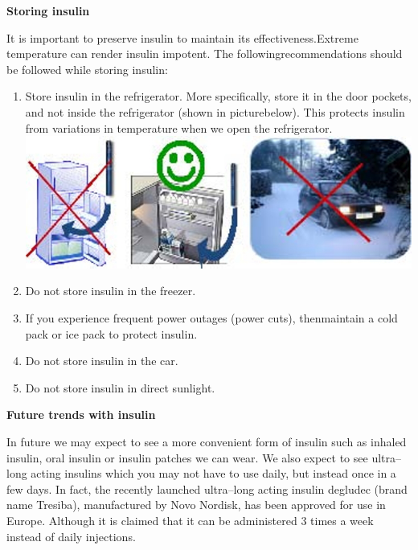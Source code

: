 \noindent\textbf{Storing insulin}

It is important to preserve insulin to maintain its effectiveness.\break Extreme temperature can render insulin impotent. The following\break recommendations should be followed while storing insulin:

\begin{enumerate}[•]
\itemsep=0pt
\item Store insulin in the refrigerator. More specifically, store it in the door pockets, and not inside the refrigerator (shown in picture\break below). This protects insulin from variations in temperature when we open the refrigerator.
\includegraphics[scale=2.2]{images/090.jpg}
\item Do not store insulin in the freezer.
\item If you experience frequent power outages (power cuts), then\break maintain a cold pack or ice pack to protect insulin.
\item Do not store insulin in the car.
\item Do not store insulin in direct sunlight.
\end{enumerate}


\vskip 8pt

\noindent\textbf{Future trends with insulin}

In future we may expect to see a more convenient form of insulin such as inhaled insulin, oral insulin or insulin patches we can wear. We also expect to see ultra–long acting insulins which you may not have to use daily, but instead once in a few days. In fact, the recently launched ultra–long acting insulin degludec (brand name Tresiba), manufactu\-red by Novo Nordisk, has been approved for use in Europe. Although it is claimed that it can be administered 3 times a week instead of daily injections.

\vskip 7pt


